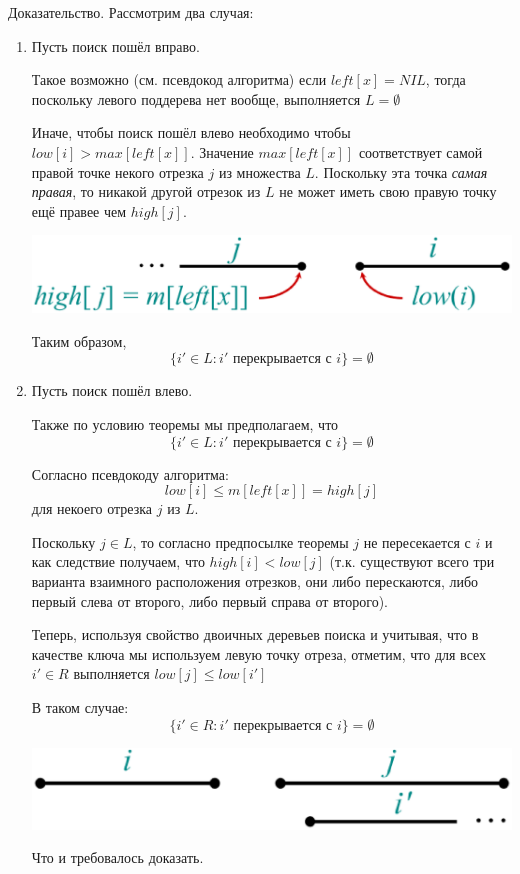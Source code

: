 \documentclass[a4paper,11pt]{article}
\begin{document}
Доказательство. Рассмотрим два случая:

\begin{enumerate}
\item Пусть поиск пошёл вправо.

  Такое возможно (см. псевдокод алгоритма) если $left[x] = NIL$, тогда поскольку
  левого поддерева нет вообще, выполняется $L = \emptyset$

  Иначе, чтобы поиск пошёл влево необходимо чтобы $low[i] > max[left[x]]$.
  Значение $max[left[x]]$ соответствует самой правой точке некого отрезка $j$ из
  множества $L$. Поскольку эта точка \emph{самая правая}, то никакой другой
  отрезок из $L$ не может иметь свою правую точку ещё правее чем $high[j]$.

  \begin{center}
    \includegraphics[width=5in]{lecture11/correctness1.eps}
  \end{center}
  
  Таким образом,
  $$
  \lbrace i' \in L \colon i' \text{ перекрывается с } i\rbrace = \emptyset
  $$

\item Пусть поиск пошёл влево.

  Также по условию теоремы мы предполагаем, что
  $$
  \lbrace i' \in L \colon i' \text{ перекрывается с } i\rbrace = \emptyset
  $$

  Согласно псевдокоду алгоритма: $$ low[i] \leq m[left[x]] = high[j] $$ для
  некоего отрезка $j$ из $L$.

  Поскольку $j \in L$, то согласно предпосылке теоремы $j$ не пересекается с
  $i$ и как следствие получаем, что $high[i] < low[j]$ (т.к. существуют всего
  три варианта взаимного расположения отрезков, они либо перескаются, либо
  первый слева от второго, либо первый справа от второго).

  Теперь, используя свойство двоичных деревьев поиска и учитывая, что в качестве
  ключа мы используем левую точку отреза, отметим, что для всех $i' \in R$
  выполняется $low[j] \leq low[i']$

  В таком случае:
  $$
  \lbrace i' \in R \colon i' \text{ перекрывается с } i\rbrace = \emptyset
  $$

  \begin{center}
    \includegraphics[width=5in]{lecture11/correctness2.eps}
  \end{center}

  Что и требовалось доказать.
  
\end{enumerate}
  
\end{document}
